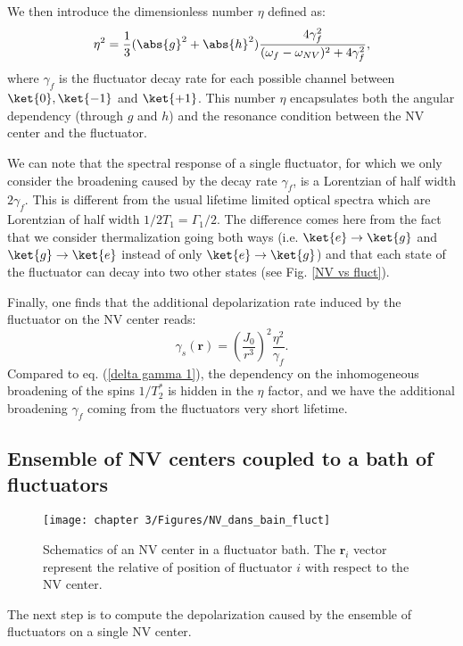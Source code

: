 \documentclass[a4paper, 11pt]{report}
\begin{document}
We then introduce the dimensionless number $\eta$ defined as:
\begin{equation}
\label{eq eta}
\eta^2=\frac{1}{3} (\abs{g}^2+\abs{h}^2)  \frac{4\gamma_f^2}{(\omega_f - \omega_{NV})^2+4\gamma_f^2},
\end{equation}
where $\gamma_f$ is the fluctuator decay rate for each possible channel between $\ket{0}, \ket{-1}$ and $\ket{+1}$. This number $\eta$ encapsulates both the angular dependency (through $g$ and $h$) and the resonance condition between the NV center and the fluctuator.

We can note that the spectral response of a single fluctuator, for which we only consider the broadening caused by the decay rate $\gamma_f$, is a Lorentzian of half width $2\gamma_f$. This is different from the usual lifetime limited optical spectra which are Lorentzian of half width $1/2T_1=\Gamma_1/2$. The difference comes here from the fact that we consider thermalization going both ways (i.e. $\ket{e} \to \ket{g}$ and $\ket{g} \to \ket{e}$ instead of only $\ket{e} \to \ket{g}$) and that each state of the fluctuator can decay into two other states (see Fig. \ref{NV vs fluct}).

Finally, one finds that the additional depolarization rate induced by the fluctuator on the NV center reads:
\begin{equation}
\gamma_s(\mathbf{r})=\left(\frac{J_0}{r^3}\right)^2 \frac{\eta^2}{\gamma_f}.
\end{equation}
Compared to eq. (\ref{delta gamma 1}), the dependency on the inhomogeneous broadening of the spins $1/T_2^*$ is hidden in the $\eta$ factor, and we have the additional broadening $\gamma_f$ coming from the fluctuators very short lifetime.

\subsection{Ensemble of NV centers coupled to a bath of fluctuators}

\begin{figure}[h]
\centering
\texttt{[image: chapter 3/Figures/NV\_dans\_bain\_fluct]}
\caption{Schematics of an NV center in a fluctuator bath. The $\mathbf{r}_i$ vector represent the relative of position of fluctuator $i$ with respect to the NV center.}
\label{NV + bain fluct}
\end{figure}

The next step is to compute the depolarization caused by the ensemble of fluctuators on a single NV center.
\end{document}

